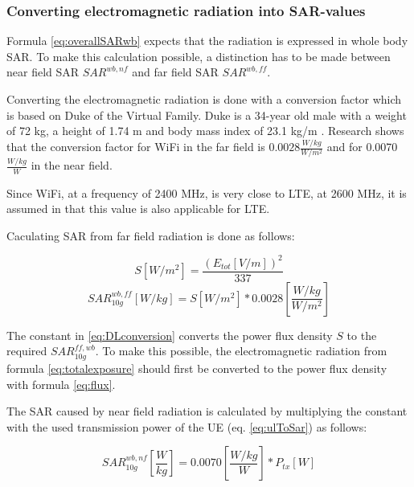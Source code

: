 \documentclass[twocolumn]{phdsymp} %
\begin{document}
\subsubsection{Converting electromagnetic radiation into SAR-values}

Formula \ref{eq:overallSARwb} expects that the radiation is expressed in whole body \gls{SAR}.
To make this calculation possible, a distinction has to be made between near field \gls{SAR}
$SAR^{wb,nf}$ and far field \gls{SAR} $SAR^{wb,ff}$.

Converting the electromagnetic radiation is done with a conversion factor which is based 
on Duke of the Virtual Family. Duke is a 34-year old male with a weight of 72 kg, a height of 1.74 m and body
mass index of 23.1 kg/m \cite{J22_plets2015joint}. 
Research shows that the conversion factor for WiFi in the far field is $0.0028 \frac{W/kg}{W/m^2}$
and for 0.0070 $\frac{W/kg}{W}$ \cite{J22_plets2015joint} in the near field.

Since WiFi, at a frequency of 2400 MHz,
is very close to LTE, at 2600 MHz, it is assumed in \cite{J22_plets2015joint} that this value is also applicable for \gls{LTE}.

Caculating \gls{SAR} from far field radiation is done as follows:

\begin{equation}
S [W/m^2]= \frac{(E_{tot} [V/m])^2}{337}
\label{eq:flux}
\end{equation}
\begin{equation}
SAR^{wb,ff}_{10g} [W/kg]= S [W/m^2]* 0.0028 \left[\frac{W/kg}{W/m^2}\right]
\label{eq:DLconversion}
\end{equation}

The constant in \ref{eq:DLconversion} converts the \gls{power flux density} $S$ to the required $SAR^{ff,wb}_{10g}$.
To make this possible, the electromagnetic radiation
from formula \ref{eq:totalexposure} should first be converted to the  \gls{power flux density} with formula 
\ref{eq:flux}.

The SAR caused by near field radiation is calculated by multiplying the constant with the used transmission
power of the \gls{UE} (eq. \ref{eq:ulToSar}) 
as follows:

\begin{equation} 
SAR^{wb,nf}_{10g} \left[\frac{W}{kg}\right] = 0.0070 \left[\frac{W/kg}{W}\right] * P_{tx} [W]
\label{eq:ulToSar}
\end{equation}
\end{document}
